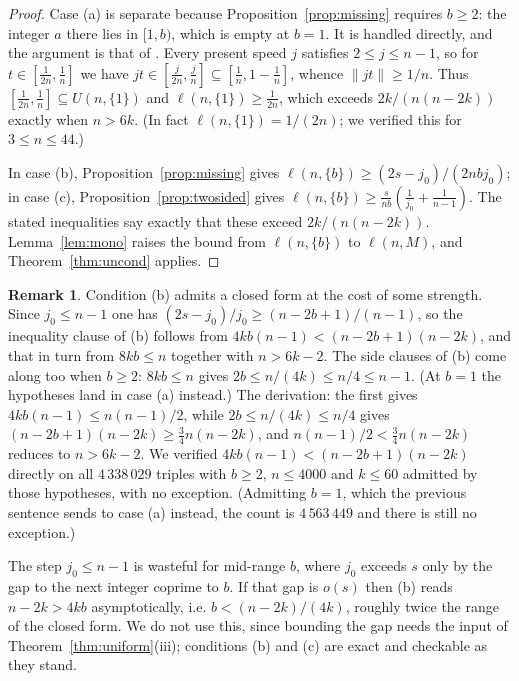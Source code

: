 \documentclass[11pt]{amsart}
\theoremstyle{plain}
\theoremstyle{definition}
\newtheorem{remark}[theorem]{Remark}
\newcommand{\nrm}[1]{\left\lVert #1 \right\rVert}
\begin{document}
\begin{proof}
Case (a) is separate because Proposition~\ref{prop:missing} requires $b\ge2$: the integer $a$ there
lies in $[1,b)$, which is empty at $b=1$. It is handled directly, and the argument is that of
\cite[proof of Thm.~2.3, case $r=1$]{gw}. Every present speed $j$ satisfies
$2\le j\le n-1$, so for $t\in[\tfrac1{2n},\tfrac1n]$ we have
$jt\in[\tfrac{j}{2n},\tfrac{j}{n}]\subseteq[\tfrac1n,1-\tfrac1n]$, whence $\nrm{jt}\ge1/n$. Thus
$[\tfrac1{2n},\tfrac1n]\subseteq U(n,\{1\})$ and $\ell(n,\{1\})\ge\tfrac1{2n}$, which exceeds
$2k/(n(n-2k))$ exactly when $n>6k$. (In fact $\ell(n,\{1\})=1/(2n)$; we verified this for
$3\le n\le44$.)

In case (b), Proposition~\ref{prop:missing} gives $\ell(n,\{b\})\ge(2s-j_0)/(2nbj_0)$; in case (c),
Proposition~\ref{prop:twosided} gives $\ell(n,\{b\})\ge\frac{s}{nb}(\frac1{j_0}+\frac1{n-1})$. The
stated inequalities say exactly that these exceed $2k/(n(n-2k))$. Lemma~\ref{lem:mono} raises the bound from $\ell(n,\{b\})$ to $\ell(n,M)$, and
Theorem~\ref{thm:uncond} applies.
\end{proof}

\begin{remark}\label{rem:closed}
Condition (b) admits a closed form at the cost of some strength. Since $j_0\le n-1$ one has
$(2s-j_0)/j_0\ge(n-2b+1)/(n-1)$, so the inequality clause of (b) follows from
$4kb(n-1)<(n-2b+1)(n-2k)$, and that in turn from $8kb\le n$ together with $n>6k-2$. The side clauses
of (b) come along too when $b\ge2$: $8kb\le n$ gives $2b\le n/(4k)\le n/4\le n-1$. (At $b=1$ the
hypotheses land in case (a) instead.) The derivation: the first gives $4kb(n-1)\le n(n-1)/2$, while
$2b\le n/(4k)\le n/4$ gives $(n-2b+1)(n-2k)\ge\tfrac34n(n-2k)$, and $n(n-1)/2<\tfrac34n(n-2k)$
reduces to $n>6k-2$. We verified $4kb(n-1)<(n-2b+1)(n-2k)$ directly on all $4\,338\,029$ triples
with $b\ge2$, $n\le4000$ and $k\le60$ admitted by those hypotheses, with no exception. (Admitting
$b=1$, which the previous sentence sends to case (a) instead, the count is $4\,563\,449$ and there
is still no exception.)

The step $j_0\le n-1$ is wasteful for mid-range $b$, where $j_0$ exceeds $s$ only by the gap to the
next integer coprime to $b$. If that gap is $o(s)$ then (b) reads $n-2k>4kb$ asymptotically, i.e.
$b<(n-2k)/(4k)$, roughly twice the range of the closed form. We do not use this, since bounding the
gap needs the input of Theorem~\ref{thm:uniform}(iii); conditions (b) and (c) are exact and
checkable as they stand.
\end{remark}
\end{document}
